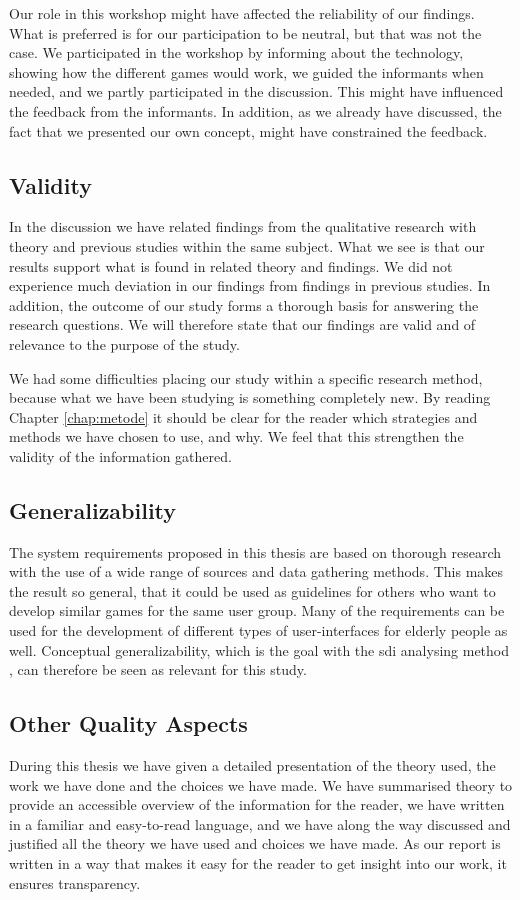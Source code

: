 Our role in this workshop might have affected the reliability of our findings. What is preferred is for our participation to be neutral, but that was not the case. We participated in the workshop by informing about the technology, showing how the different games would work, we guided the informants when needed, and we partly participated in the discussion. This might have influenced the feedback from the informants. In addition, as we already have discussed, the fact that we presented our own concept, might have constrained the feedback. 


\subsection{Validity}

In the discussion we have related findings from the qualitative research with theory and previous studies within the same subject. What we see is that our results support what is found in related theory and findings. We did not experience much deviation in our findings from findings in previous studies. In addition, the outcome of our study forms a thorough basis for answering the research questions. We will therefore state that our findings are valid and of relevance to the purpose of the study. 

We had some difficulties placing our study within a specific research method, because what we have been studying is something completely new. By reading Chapter \ref{chap:metode} it should be clear for the reader which strategies and methods we have chosen to use, and why. We feel that this strengthen the validity of the information gathered. 
    
\subsection{Generalizability}    
The system requirements proposed in this thesis are based on thorough research with the use of a wide range of sources and data gathering methods. This makes the result so general, that it could be used as guidelines for others who want to develop similar games for the same user group. Many of the requirements can be used for the development of different types of user-interfaces for elderly people as well. Conceptual generalizability, which is the goal with the \ac{sdi} analysing method \cite{tjora}, can therefore be seen as relevant for this study. 

\subsection{Other Quality Aspects}
During this thesis we have given a detailed presentation of the theory used, the work we have done and the choices we have made. We have summarised theory to provide an accessible overview of the information for the reader, we have written in a familiar and easy-to-read language, and we have along the way discussed and justified all the theory we have used and choices we have made. As our report is written in a way that makes it easy for the reader to get insight into our work, it ensures transparency.

